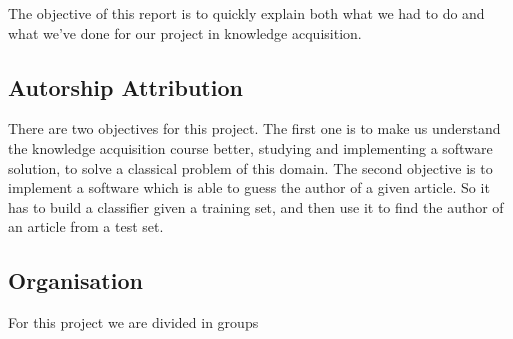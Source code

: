 The objective of this report is to quickly explain both what we had to do and what we've done for our project in knowledge acquisition. 

\subsection{Autorship Attribution}

There are two objectives for this project. The first one is to make us understand the knowledge acquisition course better, studying and implementing a software solution, to solve a classical problem of this domain. The second objective is to implement a software which is able to guess the author of a given article. So it has to build a classifier given a training set, and then use it to find the author of an article from a test set.

\subsection{Organisation}

For this project we are divided in groups 